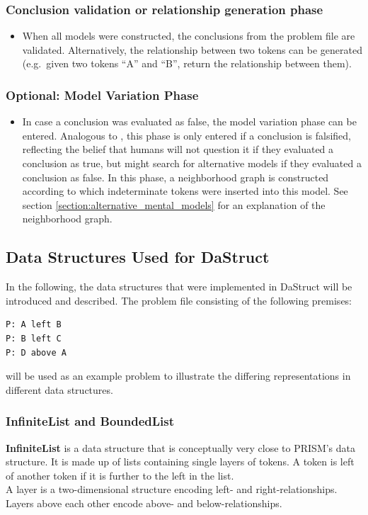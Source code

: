 \documentclass[hidelinks]{scrartcl}
\begin{document}
\subsubsection{Conclusion validation or relationship generation phase}
\begin{itemize}
\item When all models were constructed, the conclusions from the problem file are validated. Alternatively, the relationship between two tokens can be generated (e.g.\ given two tokens ``A'' and ``B'', return the relationship between them).
\end{itemize}

\subsubsection{Optional: Model Variation Phase}
\begin{itemize}
\item In case a conclusion was evaluated as false, the model variation phase can be entered. Analogous to \cite{Ragni.2013}, this phase is only entered if a conclusion is falsified, reflecting the belief that humans will not question it if they evaluated a conclusion as true, but might search for alternative models if they evaluated a conclusion as false. In this phase, a neighborhood graph is constructed according to which indeterminate tokens were inserted into this model. See section \ref{section:alternative_mental_models} for an explanation of the neighborhood graph.
\end{itemize}

\subsection{Data Structures Used for DaStruct}\label{sec:data_structs}
In the following, the data structures that were implemented in DaStruct will be introduced and described. The problem file consisting of the following premises:

\begin{lstlisting}[caption=Exemplary problem file, label=pf:example_pf, frame=single]
P: A left B
P: B left C
P: D above A
\end{lstlisting}

\noindent will be used as an example problem to illustrate the differing representations in different data structures.

\subsubsection{InfiniteList and BoundedList}
\textbf{InfiniteList} is a data structure that is conceptually very close to PRISM's data structure. It is made up of lists containing single layers of tokens. A token is left of another token if it is further to the left in the list. \\
A layer is a two-dimensional structure encoding left- and right-relationships. Layers above each other encode above- and below-relationships. \\
\end{document}
